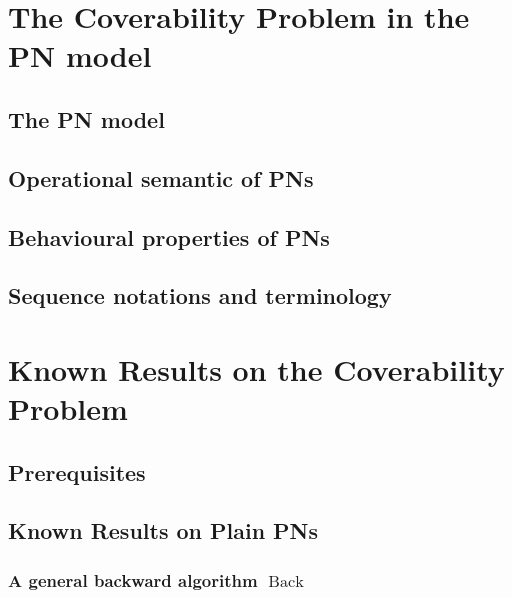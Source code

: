 \documentclass[11pt,a4paper,oneside]{book}
\theoremstyle{plain}
\theoremstyle{definition}
\theoremstyle{remark}
\DeclareMathOperator{\back}{Back}
\begin{document}
\acresetall

\chapter{The Coverability Problem in the \acl{PN} model}
\label{sec:the-coverability-problem}

%
\section{The \ac{PN} model}
\label{sec:the-pn-model}


%
\section{Operational semantic of \acp{PN}}
\label{sec:operational-semantic-of-pn}


%
\section{Behavioural properties of \acp{PN}}
\label{sec:behavioural-properties-of-pn}


%
\section{Sequence notations and terminology}
\label{sec:sequence-notations-and-terminology}


\chapter{Known Results on the Coverability Problem}
\label{sec:known-results-on-the-coverability-problem}


%
\section{Prerequisites}
\label{sec:prerequisites}


%
\section{Known Results on Plain \acp{PN}}
\label{sec:known-results-on-plain-pn}
\subsection{A general backward algorithm $\back$}
\label{sec:a-general-backward-algorithm-back}
\label{sec:backward-algorithm}

\end{document}
